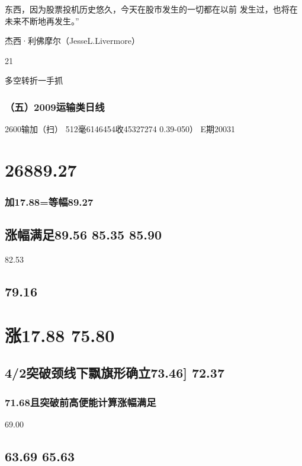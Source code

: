 \documentclass{article}
\begin{document}
东西，因为股票投机历史悠久，今天在股市发生的一切都在以前 发生过，也将在未来不断地再发生。”

杰西·利佛摩尔（JesseL.Livermore）

21

\clearpage

多空转折一手抓

\subsubsection{（五）2009运输类日线}

2600输加（扫） 512毫6146454收45327274 0.39-050） E期20031

\section{26889.27}

\subsubsection{加17.88=等幅89.27}

\subsection{涨幅满足89.56 85.35 85.90}

82.53

\subsection{79.16}

\section{涨17.88 75.80}

\subsection{4/2突破颈线下飘旗形确立73.46] 72.37}

\subsubsection{71.68且突破前高便能计算涨幅满足}

69.00

\subsection{63.69 65.63}
\end{document}
